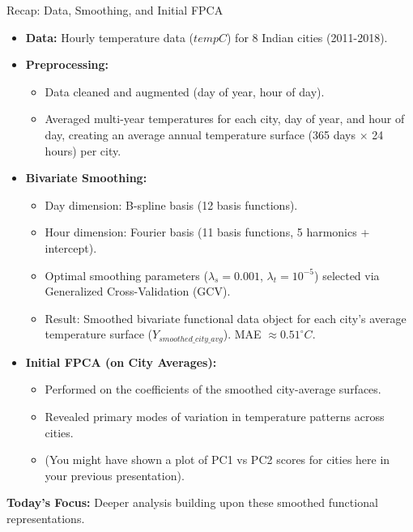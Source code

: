 \documentclass[svgnames, 12pt]{beamer}
\begin{document}
\begin{frame}{Recap: Data, Smoothing, and Initial FPCA}
  \begin{itemize}
    \item \textbf{Data:} Hourly temperature data ($tempC$) for 8 Indian cities (2011-2018).
    \item \textbf{Preprocessing:}
        \begin{itemize}
            \item Data cleaned and augmented (day of year, hour of day).
            \item Averaged multi-year temperatures for each city, day of year, and hour of day, creating an average annual temperature surface (365 days $\times$ 24 hours) per city.
        \end{itemize}
    \item \textbf{Bivariate Smoothing:}
        \begin{itemize}
            \item Day dimension: B-spline basis (12 basis functions).
            \item Hour dimension: Fourier basis (11 basis functions, 5 harmonics + intercept).
            \item Optimal smoothing parameters ($\lambda_s = 0.001$, $\lambda_t = 10^{-5}$) selected via Generalized Cross-Validation (GCV).
            \item Result: Smoothed bivariate functional data object for each city's average temperature surface ($Y_{smoothed\_city\_avg}$). MAE $\approx 0.51^\circ C$.
        \end{itemize}
    \item \textbf{Initial FPCA (on City Averages):}
        \begin{itemize}
            \item Performed on the coefficients of the smoothed city-average surfaces.
            \item Revealed primary modes of variation in temperature patterns across cities.
            \item (You might have shown a plot of PC1 vs PC2 scores for cities here in your previous presentation).
        \end{itemize}
  \end{itemize}
  \pause
  \textbf{Today's Focus:} Deeper analysis building upon these smoothed functional representations.
\end{frame}

\end{document}
